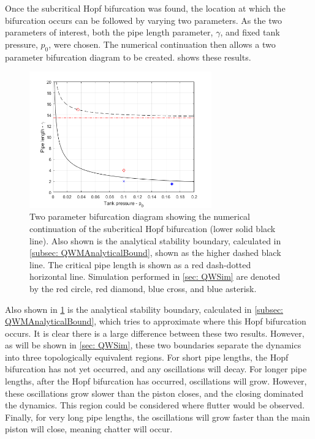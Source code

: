 Once the subcritical Hopf bifurcation was found, the location at which the bifurcation occurs can be followed by varying two parameters. As the two parameters of interest, both the pipe length parameter, $\gamma$, and fixed tank pressure, $p_0$, were chosen. The numerical continuation then allows a two parameter bifurcation diagram to be created.  shows these results.
% 
~
\begin{figure}[ht]
    \centering
    \includegraphics[width=0.7\textwidth]{Figures/BifurcationDiagram.png}
    \caption{Two parameter bifurcation diagram showing the numerical continuation of the subcritical Hopf bifurcation (lower solid black line). Also shown is the analytical stability boundary, calculated in \cref{subsec: QWMAnalyticalBound}, shown as the higher dashed black line. The critical pipe length is shown as a red dash-dotted horizontal line. Simulation performed in \cref{sec: QWSim} are denoted by the red circle, red diamond, blue cross, and blue asterisk.}
    \label{fig: BifurcationDiagram}
\end{figure}
% 

Also shown in \cref{fig: BifurcationDiagram} is the analytical stability boundary, calculated in \cref{subsec: QWMAnalyticalBound}, which tries to approximate where this Hopf bifurcation occurs. It is clear there is a large difference between these two results. However, as will be shown in \cref{sec: QWSim}, these two boundaries separate the dynamics into three topologically equivalent regions. For short pipe lengths, the Hopf bifurcation has not yet occurred, and any oscillations will decay. For longer pipe lengths, after the Hopf bifurcation has occurred, oscillations will grow. However, these oscillations grow slower than the piston closes, and the closing dominated the dynamics. This region could be considered where flutter would be observed. Finally, for very long pipe lengths, the oscillations will grow faster than the main piston will close, meaning chatter will occur.

